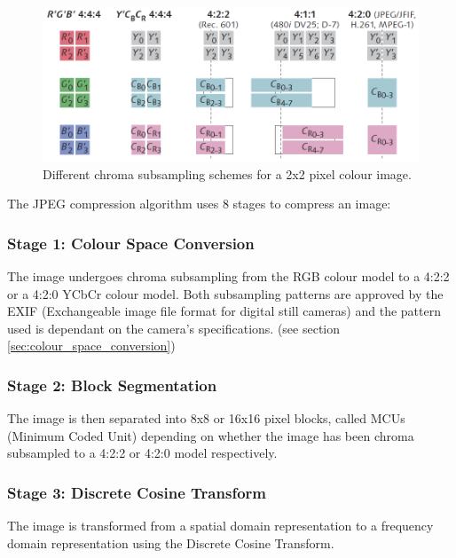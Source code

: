 \begin{figure}[!hbtp]
\begin{center}
\includegraphics[scale=0.5]{figures/chromasub.png} 
\end{center}
\caption{Different chroma subsampling schemes for a 2x2 pixel colour image.\label{chroma_examples}\cite{poynton_chroma_subsampling}}
\end{figure}


The JPEG compression algorithm uses 8 
stages to compress an image: \cite{hass_impulse_jpeg}

\subsubsection{Stage 1: Colour Space Conversion}
The image undergoes chroma subsampling from the 
RGB colour model to a 4:2:2 or a 4:2:0 YCbCr colour model. 
Both subsampling patterns are approved by the
EXIF (Exchangeable image file format for digital still cameras)
and the pattern used is dependant on the camera's specifications. 
(see section \ref{sec:colour_space_conversion})

\subsubsection{Stage 2: Block Segmentation}
The image is then separated into 8x8 or 16x16 pixel blocks,
called MCUs (Minimum Coded Unit) 
depending on whether the image has been chroma
subsampled to a 4:2:2 or 4:2:0 model respectively. \cite{exif_std}

\subsubsection{Stage 3: Discrete Cosine Transform}
The image is transformed from a spatial domain 
representation to a frequency domain representation
using the Discrete Cosine Transform. \cite{hass_impulse_jpeg}

